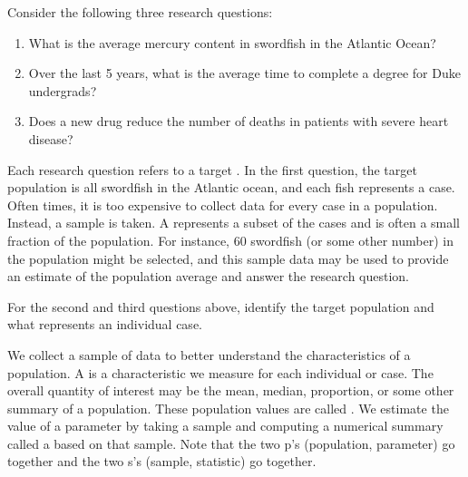 \noindent Consider the following three research questions:
\begin{enumerate}
\setlength{\itemsep}{0mm}
\item What is the average mercury content in swordfish in the Atlantic Ocean?
\item\label{timeToGraduationQuestionForUCLAStudents} Over the last 5 years, what is the average time to complete a degree for Duke undergrads?
\item\label{identifyPopulationOfStentStudy} Does a new drug reduce the number of deaths in patients with severe heart disease?
\end{enumerate}
Each research question refers to a target . In the first question, the target population is all swordfish in the Atlantic ocean, and each fish represents a case. Often times, it is too expensive to collect data for every case in a population. Instead, a sample is taken. A  represents a subset of the cases and is often a small fraction of the population. For instance, 60 swordfish (or some other number) in the population might be selected, and this sample data may be used to provide an estimate of the population average and answer the research question.

\begin{exercisewrap}
\begin{nexercise} \label{identifyingThePopulationForTwoQuestionsInPopAndSampSubsection}
For the second and third questions above, identify the target population and what represents an individual case.\footnotemark
\end{nexercise}
\end{exercisewrap}

\D{\newpage}

We collect a sample of data to better understand the characteristics of a population. A  is a characteristic we measure for each individual or case. The overall quantity of interest may be the mean, median, proportion, or some other summary of a population. These population values are called . We estimate the value of a parameter by taking a sample and computing a numerical summary called a  based on that sample. Note that the two p's (population, parameter) go together and the two s's (sample, statistic) go together.

